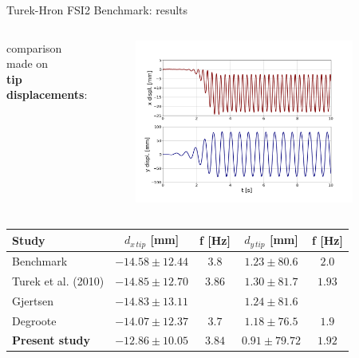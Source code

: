 \documentclass[10pt,t]{beamer}
\begin{document}
\begin{frame}{Turek-Hron FSI2 Benchmark: results}

\begin{columns}

comparison made on \\ \textbf{tip displacements}:



\vspace{-1cm}
\begin{figure}[htbp!]
	\includegraphics[width=0.9\textwidth, trim=20 20 20 20, clip]{images/FSI2/fsi2_displ_pres.png}
\end{figure}


\end{columns}



\footnotesize
\begin{center}
\begin{tabular}{ l | c c | c c  |  } 
	Study & $d_{x\,tip}$ [\si{mm}] & f [\si{Hz}] & $d_{y\,tip}$ [\si{mm}] & f [\si{Hz}] \\ 
	\hline
	\hline
	Benchmark & $-14.58\pm12.44$ & $3.8$ & $1.23\pm80.6$ & $2.0$ \\
	Turek et al. (2010) & $-14.85\pm12.70$ & $3.86$ & $1.30\pm81.7$ & $1.93$ \\
	Gjertsen & $-14.83\pm13.11$ & & $1.24\pm81.6$ & \\
	Degroote & $-14.07\pm12.37$ & $3.7$ & $1.18\pm76.5$ & $1.9$ \\
	\hline
	\cellcolor{green!10}\textbf{Present study} & \cellcolor{green!10}$-12.86\pm10.05$ & 
	\cellcolor{green!10}$3.84$ & \cellcolor{green!10}$0.91\pm79.72$ & \cellcolor{green!10}$1.92$ \\ 
\end{tabular}
    
\end{center}
\vspace{0.2cm}

\end{frame}
\end{document}
